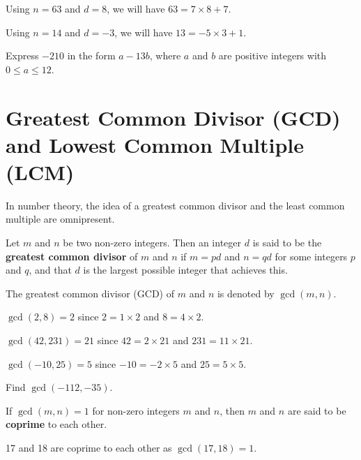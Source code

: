 \begin{example}
    Using $n = 63$ and $d = 8$, we will have $63 = 7\times8 + 7$.
\end{example}
\begin{example}
    Using $n = 14$ and $d = -3$, we will have $13 = -5\times3 + 1$.
\end{example}

\begin{exercise}
    Express $-210$ in the form $a-13b$, where $a$ and $b$ are positive integers with $0 \leq a \leq 12$.
\end{exercise}

\section{Greatest Common Divisor (GCD) and Lowest Common Multiple (LCM)}
In number theory, the idea of a greatest common divisor and the least common multiple are omnipresent.

\begin{definition}
    Let $m$ and $n$ be two non-zero integers. Then an integer $d$ is said to be the \textbf{greatest common divisor} of $m$ and $n$ if $m = pd$ and $n = qd$ for some integers $p$ and $q$, and that $d$ is the largest possible integer that achieves this.
\end{definition}
The greatest common divisor (GCD) of $m$ and $n$ is denoted by $\gcd(m, n)$.

\begin{example}
    $\gcd(2, 8) = 2$ since $2 = 1 \times 2$ and $8 = 4 \times 2$.
\end{example}
\begin{example}
    $\gcd(42, 231) = 21$ since $42 = 2 \times 21$ and $231 = 11 \times 21$.
\end{example}
\begin{example}
    $\gcd(-10, 25) = 5$ since $-10 = -2 \times 5$ and $25 = 5 \times 5$.
\end{example}
\begin{exercise}
    Find $\gcd(-112, -35)$.
\end{exercise}

\begin{remark}
    If $\gcd(m, n) = 1$ for non-zero integers $m$ and $n$, then $m$ and $n$ are said to be \textbf{coprime} to each other.
\end{remark}
\begin{example}
    17 and 18 are coprime to each other as $\gcd(17, 18) = 1$.
\end{example}

